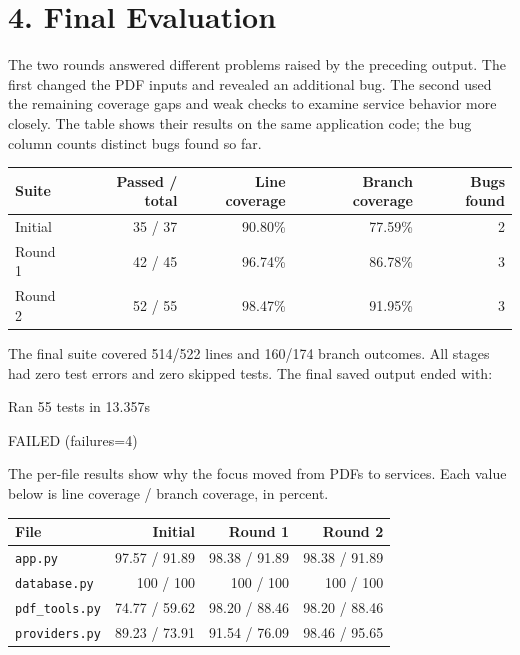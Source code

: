 \documentclass[10pt,letterpaper]{article}
\newcommand{\reportsection}[1]{\section*{\color{black}#1}}
\begin{document}
\clearpage
\reportsection{4. Final Evaluation}

The two rounds answered different problems raised by the preceding output. The first changed the PDF inputs and revealed an additional bug. The second used the remaining coverage gaps and weak checks to examine service behavior more closely. The table shows their results on the same application code; the bug column counts distinct bugs found so far.

\begin{center}
\small
\renewcommand{\arraystretch}{1.15}
\begin{tabular}{@{}l r r r r@{}}
\toprule
Suite & Passed / total & Line coverage & Branch coverage & Bugs found \\
\midrule
Initial & 35 / 37 & 90.80\% & 77.59\% & 2 \\
Round 1 & 42 / 45 & 96.74\% & 86.78\% & 3 \\
Round 2 & 52 / 55 & 98.47\% & 91.95\% & 3 \\
\bottomrule
\end{tabular}
\end{center}

The final suite covered 514/522 lines and 160/174 branch outcomes. All stages had zero test errors and zero skipped tests. The final saved output ended with:
\begin{reportcode}
Ran 55 tests in 13.357s

FAILED (failures=4)
\end{reportcode}

The per-file results show why the focus moved from PDFs to services. Each value below is line coverage / branch coverage, in percent.

\begin{center}
\small
\renewcommand{\arraystretch}{1.15}
\begin{tabular}{@{}l r r r@{}}
\toprule
File & Initial & Round 1 & Round 2 \\
\midrule
\texttt{app.py} & 97.57 / 91.89 & 98.38 / 91.89 & 98.38 / 91.89 \\
\texttt{database.py} & 100 / 100 & 100 / 100 & 100 / 100 \\
\texttt{pdf\_tools.py} & 74.77 / 59.62 & 98.20 / 88.46 & 98.20 / 88.46 \\
\texttt{providers.py} & 89.23 / 73.91 & 91.54 / 76.09 & 98.46 / 95.65 \\
\bottomrule
\end{tabular}
\end{center}
\end{document}
